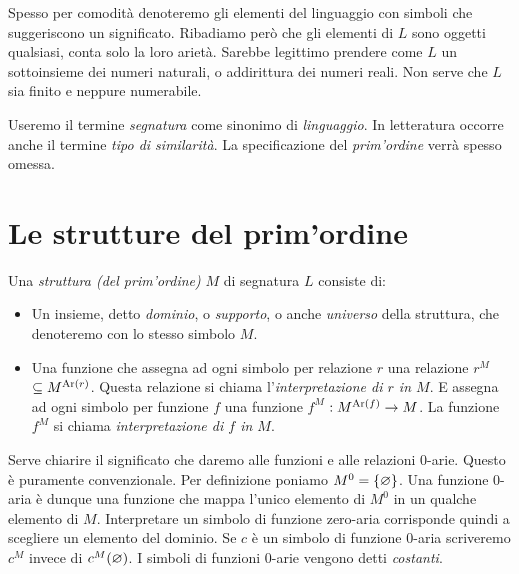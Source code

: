 Spesso per comodit\`a denoteremo gli elementi del linguaggio con simboli che suggeriscono un significato. Ribadiamo per\`o che gli elementi di $L$ sono oggetti qualsiasi, conta solo la loro ariet\`a. Sarebbe legittimo prendere come $L$ un sottoinsieme dei numeri naturali, o addirittura dei numeri reali. Non serve che $L$ sia finito e neppure numerabile.

Useremo il termine \emph{segnatura\/} come sinonimo di {\it linguaggio}. In letteratura occorre anche il termine \emph{tipo di similarit\`a}. La specificazione del \textit{prim'ordine\/} verr\`a spesso omessa.

\section{Le strutture del prim'ordine}
\label{strutture}

Una \emph{struttura (del prim'ordine)\/} $M$ di segnatura $L$ consiste di:

\begin{itemize}
\item Un insieme, detto \emph{dominio}, o \emph{supporto}, o anche \emph{universo\/} della struttura, che denoteremo con lo stesso simbolo $M$.
\item Una funzione che assegna ad ogni simbolo per relazione $r$ una relazione \emph{$r^M$} $\subseteq M^{{\rm Ar}(r)}$. Questa relazione si chiama l'\emph{interpretazione di $r$ in $M$}.  E assegna ad ogni simbolo per funzione $f$ una funzione \emph{$f^M$} $: M^{{\rm Ar}(f)}\to M$. La funzione $f^M$ si chiama \emph{interpretazione di $f$ in $M$}.
\end{itemize}

Serve chiarire il significato che daremo alle funzioni e alle relazioni $0$-arie. Questo \`e puramente convenzionale. Per definizione poniamo $M^0=\{\varnothing\}$. Una funzione $0$-aria \`e dunque una funzione che mappa l'unico elemento di $M^0$ in un qualche elemento di $M$. Interpretare un simbolo di funzione zero-aria corrisponde quindi a scegliere un elemento del dominio. Se $c$ \`e un simbolo di funzione $0$-aria scriveremo $c^M$ invece di $c^M(\varnothing)$. I simboli di funzioni $0$-arie vengono detti \emph{costanti}. %


